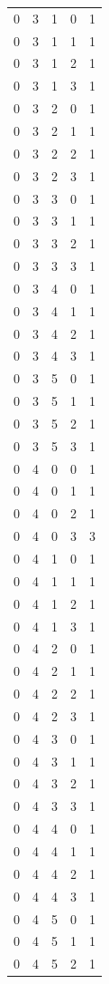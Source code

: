 \begin{longtable}{rrrrr}
0 & 3 & 1 & 0 & 1 \\
0 & 3 & 1 & 1 & 1 \\
0 & 3 & 1 & 2 & 1 \\
0 & 3 & 1 & 3 & 1 \\
0 & 3 & 2 & 0 & 1 \\
0 & 3 & 2 & 1 & 1 \\
0 & 3 & 2 & 2 & 1 \\
0 & 3 & 2 & 3 & 1 \\
0 & 3 & 3 & 0 & 1 \\
0 & 3 & 3 & 1 & 1 \\
0 & 3 & 3 & 2 & 1 \\
0 & 3 & 3 & 3 & 1 \\
0 & 3 & 4 & 0 & 1 \\
0 & 3 & 4 & 1 & 1 \\
0 & 3 & 4 & 2 & 1 \\
0 & 3 & 4 & 3 & 1 \\
0 & 3 & 5 & 0 & 1 \\
0 & 3 & 5 & 1 & 1 \\
0 & 3 & 5 & 2 & 1 \\
0 & 3 & 5 & 3 & 1 \\
0 & 4 & 0 & 0 & 1 \\
0 & 4 & 0 & 1 & 1 \\
0 & 4 & 0 & 2 & 1 \\
0 & 4 & 0 & 3 & 3 \\
0 & 4 & 1 & 0 & 1 \\
0 & 4 & 1 & 1 & 1 \\
0 & 4 & 1 & 2 & 1 \\
0 & 4 & 1 & 3 & 1 \\
0 & 4 & 2 & 0 & 1 \\
0 & 4 & 2 & 1 & 1 \\
0 & 4 & 2 & 2 & 1 \\
0 & 4 & 2 & 3 & 1 \\
0 & 4 & 3 & 0 & 1 \\
0 & 4 & 3 & 1 & 1 \\
0 & 4 & 3 & 2 & 1 \\
0 & 4 & 3 & 3 & 1 \\
0 & 4 & 4 & 0 & 1 \\
0 & 4 & 4 & 1 & 1 \\
0 & 4 & 4 & 2 & 1 \\
0 & 4 & 4 & 3 & 1 \\
0 & 4 & 5 & 0 & 1 \\
0 & 4 & 5 & 1 & 1 \\
0 & 4 & 5 & 2 & 1 \\

\end{longtable}
